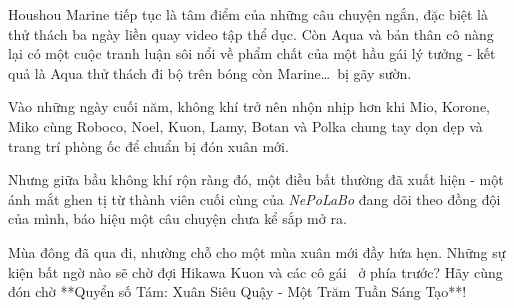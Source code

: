 \documentclass[main.tex]{subfiles}
\begin{document}
Houshou Marine tiếp tục là tâm điểm của những câu chuyện ngắn, đặc biệt là thử thách ba ngày liền quay video tập thể dục. Còn Aqua và bản thân cô nàng lại có một cuộc tranh luận sôi nổi về phẩm chất của một hầu gái lý tưởng - kết quả là Aqua thử thách đi bộ trên bóng còn Marine\dots\ bị gãy sườn.  

Vào những ngày cuối năm, không khí trở nên nhộn nhịp hơn khi Mio, Korone, Miko cùng Roboco, Noel, Kuon, Lamy, Botan và Polka chung tay dọn dẹp và trang trí phòng ốc để chuẩn bị đón xuân mới. 

Nhưng giữa bầu không khí rộn ràng đó, một điều bất thường đã xuất hiện - một ánh mắt ghen tị từ thành viên cuối cùng của \textit{NePoLaBo} đang dõi theo đồng đội của mình, báo hiệu một câu chuyện chưa kể sắp mở ra.  

Mùa đông đã qua đi, nhường chỗ cho một mùa xuân mới đầy hứa hẹn. Những sự kiện bất ngờ nào sẽ chờ đợi Hikawa Kuon và các cô gái \hll\ ở phía trước? Hãy cùng đón chờ **Quyển số Tám: Xuân Siêu Quậy - Một Trăm Tuần Sáng Tạo**!
\end{document}
